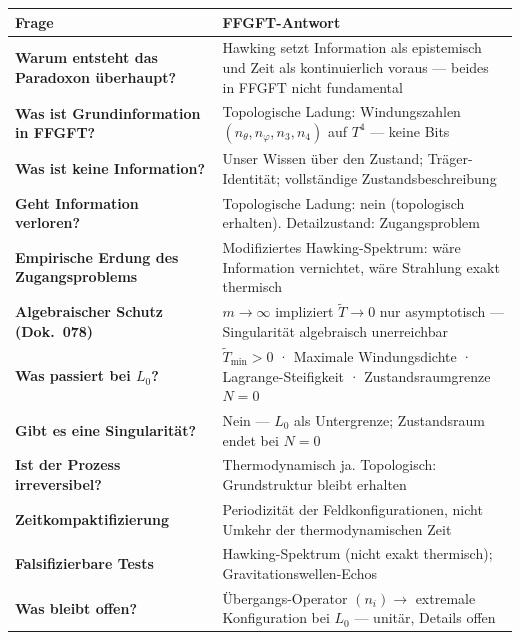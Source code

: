 \begin{longtable}{>{\bfseries}p{6cm} p{8cm}}
\toprule
Frage & FFGFT-Antwort \\
\midrule
Warum entsteht das Paradoxon überhaupt? & Hawking setzt Information als epistemisch und Zeit als kontinuierlich voraus --- beides in FFGFT nicht fundamental \\
Was ist Grundinformation in FFGFT? & Topologische Ladung: Windungszahlen $(n_\theta, n_\varphi, n_3, n_4)$ auf $T^4$ --- keine Bits \\
Was ist keine Information? & Unser Wissen über den Zustand; Träger-Identität; vollständige Zustandsbeschreibung \\
Geht Information verloren? & Topologische Ladung: nein (topologisch erhalten). Detailzustand: Zugangsproblem \\
Empirische Erdung des Zugangsproblems & Modifiziertes Hawking-Spektrum: wäre Information vernichtet, wäre Strahlung exakt thermisch \\
Algebraischer Schutz (Dok.~078) & $m \rightarrow \infty$ impliziert $\tilde{T} \rightarrow 0$ nur asymptotisch --- Singularität algebraisch unerreichbar \\
Was passiert bei $L_0$? & $\tilde{T}_\text{min} > 0$ · Maximale Windungsdichte · Lagrange-Steifigkeit · Zustandsraumgrenze $N=0$ \\
Gibt es eine Singularität? & Nein --- $L_0$ als Untergrenze; Zustandsraum endet bei $N = 0$ \\
Ist der Prozess irreversibel? & Thermodynamisch ja. Topologisch: Grundstruktur bleibt erhalten \\
Zeitkompaktifizierung & Periodizität der Feldkonfigurationen, nicht Umkehr der thermodynamischen Zeit \\
Falsifizierbare Tests & Hawking-Spektrum (nicht exakt thermisch); Gravitationswellen-Echos \\
Was bleibt offen? & Übergangs-Operator $(n_i) \rightarrow$ extremale Konfiguration bei $L_0$ --- unitär, Details offen \\
\bottomrule
\end{longtable}
